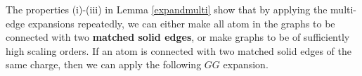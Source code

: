 \documentclass{article}
\newcommand{\1}{\mathds{1}}
\numberwithin{equation}{section}
\theoremstyle{plain} %
\theoremstyle{remark}
\begin{document}
 


The properties (i)-(iii) in Lemma \ref{expandmulti} show that by applying the multi-edge expansions repeatedly, we can either make all atom in the graphs to be connected with two {\bf matched solid edges}, or make graphs to be of sufficiently high scaling orders. 
If an atom is connected with two matched solid edges of the same charge, then we can apply the following $GG$ expansion.  
\fi
\end{document}
